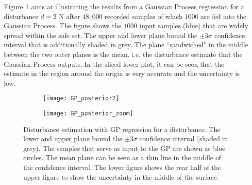 \documentclass[../main.tex]{subfiles}
\begin{document}
Figure \ref{fig:GP_posterior} aims at illustrating the results from a Gaussian Process regression for a disturbance $d = 2 \text{ N}$ after $48,000$ recorded samples of which $1000$ are fed into the Gaussian Process. The figure shows the $1000$ input samples (blue) that are widely spread within the safe set. The upper and lower plane bound the $\pm 3\sigma$ confidence interval that is additionally shaded in grey. The plane ``sandwiched" in the middle between the two outer planes is the mean, i.e. the disturbance estimate that the Gaussian Process outputs. In the sliced lower plot, it can be seen that the estimate in the region around the origin is very accurate and the uncertainty is low.
\begin{figure}
    \centering
    \begin{subfigure}[t]{\textwidth}
        \texttt{[image: GP\_posterior2]}
    \end{subfigure}
    
    \begin{subfigure}[t]{\textwidth}
        \texttt{[image: GP\_posterior\_zoom]}
        \end{subfigure}    \caption{Disturbance estimation with GP regression for a disturbance. The lower and upper plane bound the $\pm 3\sigma$ confidence interval (shaded in grey). The samples that serve as input to the GP are shown as blue circles. The mean plane can be seen as a thin line in the middle of the confidence interval. The lower figure shows the rear half of the upper figure to show the uncertainty in the middle of the surface.}  \label{fig:GP_posterior}
\end{figure}
\end{document}
